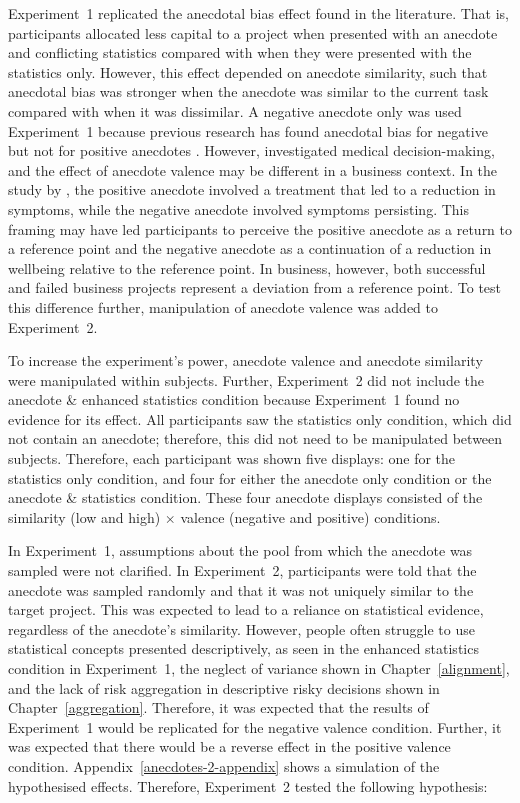 \documentclass[a4paper, nobind]{templates/ociamthesis}
\theoremstyle{definition}
\theoremstyle{definition}
\theoremstyle{definition}
\theoremstyle{definition}
\theoremstyle{remark}
\begin{document}
Experiment~1 replicated the anecdotal bias effect found in the literature. That
is, participants allocated less capital to a project when presented with an
anecdote and conflicting statistics compared with when they were presented with
the statistics only. However, this effect depended on anecdote similarity, such
that anecdotal bias was stronger when the anecdote was similar to the current
task compared with when it was dissimilar. A negative anecdote only was used
Experiment~1 because previous research has found anecdotal bias for negative but
not for positive anecdotes \autocite{jaramillo2019}. However, \textcite{jaramillo2019}
investigated medical decision-making, and the effect of anecdote valence may be
different in a business context. In the study by \textcite{jaramillo2019}, the positive
anecdote involved a treatment that led to a reduction in symptoms, while the
negative anecdote involved symptoms persisting. This framing may have led
participants to perceive the positive anecdote as a return to a reference point
and the negative anecdote as a continuation of a reduction in wellbeing relative
to the reference point. In business, however, both successful and failed
business projects represent a deviation from a reference point. To test this
difference further, manipulation of anecdote valence was added to Experiment~2.

To increase the experiment's power, anecdote valence and anecdote similarity
were manipulated within subjects. Further, Experiment~2 did not include the
anecdote \& enhanced statistics condition because Experiment~1 found no
evidence for its effect. All participants saw the statistics only condition,
which did not contain an anecdote; therefore, this did not need to be
manipulated between subjects. Therefore, each participant was shown five
displays: one for the statistics only condition, and four for either the
anecdote only condition or the anecdote \& statistics condition. These four
anecdote displays consisted of the similarity (low and high) \(\times\) valence
(negative and positive) conditions.

In Experiment~1, assumptions about the pool from which the anecdote was sampled
were not clarified. In Experiment~2, participants were told that the anecdote
was sampled randomly and that it was not uniquely similar to the target project.
This was expected to lead to a reliance on statistical evidence, regardless of
the anecdote's similarity. However, people often struggle to use statistical
concepts presented descriptively, as seen in the enhanced statistics condition
in Experiment~1, the neglect of variance shown in Chapter~\ref{alignment}, and
the lack of risk aggregation in descriptive risky decisions shown in
Chapter~\ref{aggregation}. Therefore, it was expected that the results of
Experiment~1 would be replicated for the negative valence condition. Further, it
was expected that there would be a reverse effect in the positive valence
condition. Appendix~\ref{anecdotes-2-appendix} shows a simulation of the
hypothesised effects. Therefore, Experiment~2 tested the following hypothesis:
\end{document}
